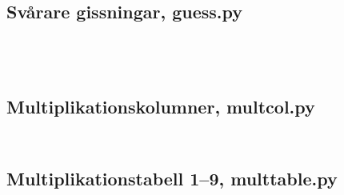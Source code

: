 \begin{frame}[fragile]
  \inputminted[firstline=6,lastline=13,firstnumber=6]{python}{examples/align_list.py}
\end{frame}

\begin{frame}[fragile]
  \inputminted[firstline=14,lastline=25,firstnumber=14]{python}{examples/align_list.py}
\end{frame}


\subsection{Svårare gissningar, guess.py}

\begin{frame}[fragile]
  \inputminted[firstline=5,lastline=10,firstnumber=5]{python}{examples/guess.py}
\end{frame}

\begin{frame}[fragile]
  \inputminted[firstline=11,lastline=25,firstnumber=11]{python}{examples/guess.py}
\end{frame}

\begin{frame}[fragile]
  \inputminted[firstline=11,lastline=13,firstnumber=11]{python}{examples/guess.py}
  \inputminted[firstline=24,firstnumber=24]{python}{examples/guess.py}
\end{frame}

\subsection{Multiplikationskolumner, multcol.py}

\begin{frame}
  \inputminted[firstline=3,lastline=18,firstnumber=3]{python}{examples/multcol.py}
\end{frame}

\begin{frame}
  \inputminted[firstline=19,firstnumber=19]{python}{examples/multcol.py}
\end{frame}

\subsection{Multiplikationstabell 1--9, multtable.py}

\begin{frame}
  \inputminted[firstline=3,lastline=12,firstnumber=3]{python}{examples/multtable.py}
\end{frame}

